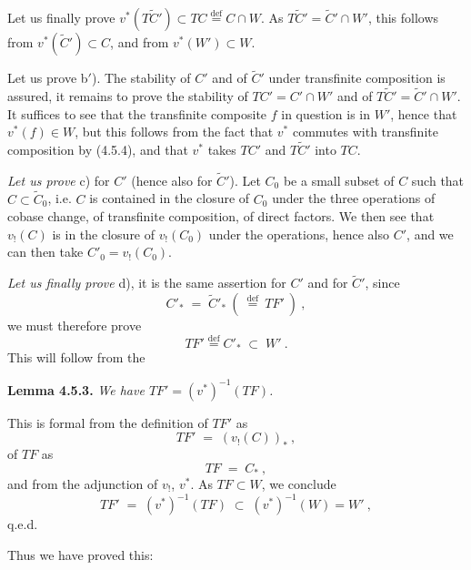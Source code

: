 \documentclass[11pt]{article}
\newcommand{\printedpage}[1]{\marginpar{\footnotesize p.~#1}}
\newcommand{\msp}[1]{\marginpar{\footnotesize [#1]}}
\newcommand{\defeq}{\overset{\text{def}}{=}}
\begin{document}
Let us finally prove $v^*(T\tilde{C}') \subset TC \defeq C \cap W$. As $T\tilde{C}' = \tilde{C}' \cap W'$, this follows from $v^*(\tilde{C}') \subset C$, and from $v^*(W') \subset W$.

Let us prove b$'$). The stability of $C'$ and of $\tilde{C}'$ under transfinite composition is assured, it remains to prove the stability of $TC' = C' \cap W'$ and of $T\tilde{C}' = \tilde{C}' \cap W'$. It suffices to see that the transfinite composite $f$ in question is in $W'$, hence that $v^*(f) \in W$, but this follows from the fact that $v^*$ commutes with transfinite composition by (4.5.4), and that $v^*$ takes $TC'$ and $T\tilde{C}'$ into $TC$.

\textit{Let us prove} c) for $C'$ (hence also for $\tilde{C}'$). Let $C_0$ be a small subset of $C$ such that $C \subset \tilde{C}_0$, i.e. $C$ is contained in the closure of $C_0$ under the three operations of cobase change, of transfinite composition, of direct factors. We then see that $v_!(C)$ is in the closure of $v_!(C_0)$ under the operations, hence also $C'$, and we can then take $C'_0 = v_!(C_0)$.

\textit{Let us finally prove} d), it is the same assertion for $C'$ and for $\tilde{C}'$, since
\[
C'_* \;=\; \tilde{C}'_*\ (\ \defeq\ TF'\ )\ ,
\]
\msp{page 78}
we must therefore prove
\[
TF' \defeq C'_* \;\subset\; W'\ .
\]
This will follow from the
\printedpage{38}

\textbf{Lemma 4.5.3.} \textit{We have $TF' = (v^*)^{-1}(TF)$.}

This is formal from the definition of $TF'$ as
\[
TF' \;=\; (v_!(C))_*\ ,
\]
of $TF$ as
\[
TF \;=\; C_*\ ,
\]
and from the adjunction of $v_!$, $v^*$. As $TF \subset W$, we conclude
\[
TF' \;=\; (v^*)^{-1}(TF) \;\subset\; (v^*)^{-1}(W) = W'\ ,
\]
q.e.d.

Thus we have proved this:
\end{document}
